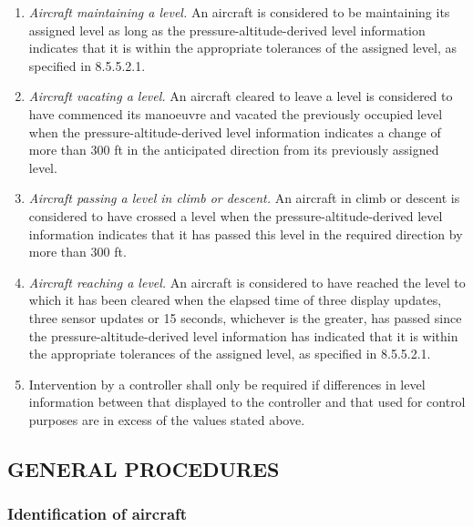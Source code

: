 \documentclass[../vATM.tex]{subfiles}
\begin{document}
\begin{enumeratesc}
\begin{enumerate}
            \item \textit{Aircraft maintaining a level.} An aircraft is considered to be maintaining its assigned level as long as the pressure-altitude-derived level information indicates that it is within the appropriate tolerances of the assigned level, as specified in 8.5.5.2.1.
            \item \textit{Aircraft vacating a level.} An aircraft cleared to leave a level is considered to have commenced its manoeuvre and vacated the previously occupied level when the pressure-altitude-derived level information indicates a change of more than 300 ft in the anticipated direction from its previously assigned level.
            \item \textit{Aircraft passing a level in climb or descent.} An aircraft in climb or descent is considered to have crossed a level when the pressure-altitude-derived level information indicates that it has passed this level in the required direction by more than 300 ft.
            \item \textit{Aircraft reaching a level.} An aircraft is considered to have reached the level to which it has been cleared when the elapsed time of three display updates, three sensor updates or 15 seconds, whichever is the greater, has passed since the pressure-altitude-derived level information has indicated that it is within the appropriate tolerances of the assigned level, as specified in 8.5.5.2.1.
            \item Intervention by a controller shall only be required if differences in level information between that displayed to the controller and that used for control purposes are in excess of the values stated above.
        \end{enumerate}
    \end{enumeratesc}

    \subsection[General procedures]{GENERAL PROCEDURES}
    

    \subsubsection{Identification of aircraft}
    
\end{document}
